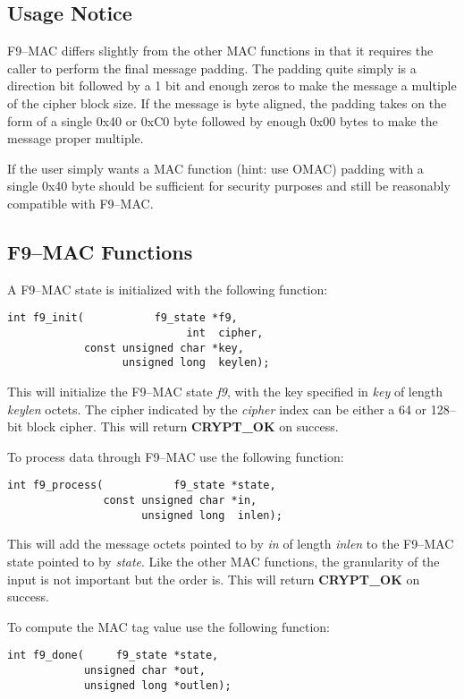 \documentclass[synpaper]{book}
\begin{document}
\subsection{Usage Notice}
F9--MAC differs slightly from the other MAC functions in that it requires the caller to perform the final message padding.  The padding quite simply is a direction
bit followed by a 1 bit and enough zeros to make the message a multiple of the cipher block size.  If the message is byte aligned, the padding takes on the form of
a single 0x40 or 0xC0 byte followed by enough 0x00 bytes to make the message proper multiple.

If the user simply wants a MAC function (hint: use OMAC) padding with a single 0x40 byte should be sufficient for security purposes and still be reasonably compatible
with F9--MAC.

\subsection{F9--MAC Functions}
A F9--MAC state is initialized with the following function:
\begin{verbatim}
int f9_init(           f9_state *f9,
                            int  cipher,
            const unsigned char *key,
                  unsigned long  keylen);
\end{verbatim}

This will initialize the F9--MAC state \textit{f9}, with the key specified in \textit{key} of length \textit{keylen} octets.  The cipher indicated
by the \textit{cipher} index can be either a 64 or 128--bit block cipher.  This will return \textbf{CRYPT\_OK} on success.

To process data through F9--MAC use the following function:
\begin{verbatim}
int f9_process(           f9_state *state,
               const unsigned char *in,
                     unsigned long  inlen);
\end{verbatim}

This will add the message octets pointed to by \textit{in} of length \textit{inlen} to the F9--MAC state pointed to by \textit{state}.  Like the other MAC functions,
the granularity of the input is not important but the order is.  This will return \textbf{CRYPT\_OK} on success.

To compute the MAC tag value use the following function:

\begin{verbatim}
int f9_done(     f9_state *state,
            unsigned char *out,
            unsigned long *outlen);
\end{verbatim}
\end{document}
